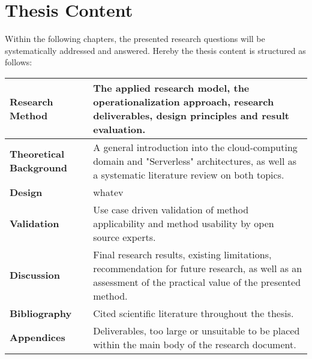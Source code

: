 \section{Thesis Content}

Within the following chapters, the presented research questions will be systematically addressed and answered. Hereby the thesis content is structured as follows:

\begin{center}
\begin{tabular}{ | m{11em} | p{23em}| } 
\hline
 \textbf{Research Method} & 
 The applied research model, the operationalization approach, research deliverables, design principles and result evaluation.  \\
 \hline 
 
 \textbf{Theoretical Background} & 
 A general introduction into the cloud-computing domain and "Serverless" architectures, as well as a systematic literature review on both topics. \\
 \hline 
 
 \textbf{Design} & 
 whatev \\
 \hline 
 
 \textbf{Validation} & 
 Use case driven validation of method applicability and method usability by open source experts. \\
 \hline 
 
 \textbf{Discussion} & 
 Final research results, existing limitations, recommendation for future research, as well as an assessment of the practical value of the presented method. \\
 \hline 
 
 \textbf{Bibliography} & 
 Cited scientific literature throughout the thesis. \\
 \hline 
 
 \textbf{Appendices} & 
 Deliverables, too large or unsuitable to be placed within the main body of the research document. \\
\hline
\end{tabular}
\end{center}

